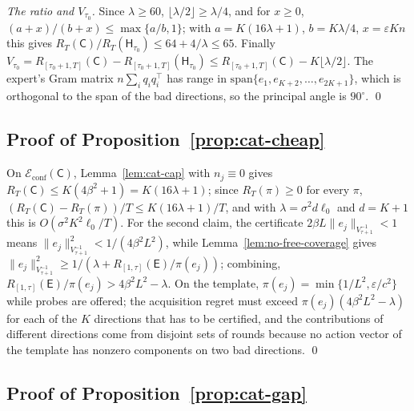 \documentclass{article}
\theoremstyle{definition}
\theoremstyle{remark}
\newcommand{\eps}{\varepsilon}
\theoremstyle{remark}
\newcommand{\Cold}{\mathsf{C}}
\newcommand{\Exp}{\mathsf{E}}
\newcommand{\Hyb}{\mathsf{H}}
\begin{document}
\emph{The ratio and $V_{\tau_0}$.} Since $\lambda\ge60$, $\lfloor\lambda/2\rfloor\ge\lambda/4$,
and for $x\ge0$, $(a+x)/(b+x)\le\max\{a/b,1\}$; with $a=K(16\lambda+1)$,
$b=K\lambda/4$, $x=\eps Kn$ this gives $R_T(\Cold)/R_T(\Hyb_{\tau_0})\le64+4/\lambda\le65$.
Finally $V_{\tau_0}=R_{[\tau_0+1,T]}(\Cold)-R_{[\tau_0+1,T]}(\Hyb_{\tau_0})\le R_{[\tau_0+1,T]}(\Cold)-K\lfloor\lambda/2\rfloor$.
The expert's Gram matrix $n\sum_iq_iq_i^\top$ has range in
$\mathrm{span}\{e_1,e_{K+2},\dots,e_{2K+1}\}$, which is orthogonal to the span of
the bad directions, so the principal angle is $90^\circ$. \qed

\subsection{Proof of Proposition~\ref{prop:cat-cheap}}

On $\mathcal E_{\mathrm{conf}}(\Cold)$, Lemma~\ref{lem:cat-cap} with $n_j\equiv0$
gives $R_T(\Cold)\le K(4\beta^2+1)=K(16\lambda+1)$; since $R_T(\pi)\ge0$ for every
$\pi$, $(R_T(\Cold)-R_T(\pi))/T\le K(16\lambda+1)/T$, and with $\lambda=\sigma^2d\ell_0$
and $d=K+1$ this is $O(\sigma^2K^2\ell_0/T)$. For the second claim, the
certificate $2\beta L\|e_j\|_{V_{\tau+1}^{-1}}<1$ means $\|e_j\|^2_{V_{\tau+1}^{-1}}<1/(4\beta^2L^2)$,
while Lemma~\ref{lem:no-free-coverage} gives
$\|e_j\|^2_{V_{\tau+1}^{-1}}\ge1/(\lambda+R_{[1,\tau]}(\Exp)/\pi(e_j))$; combining,
$R_{[1,\tau]}(\Exp)/\pi(e_j)>4\beta^2L^2-\lambda$. On the template,
$\pi(e_j)=\min\{1/L^2,\eps/c^2\}$ while probes are offered; the acquisition
regret must exceed $\pi(e_j)(4\beta^2L^2-\lambda)$ for each of the $K$ directions
that has to be certified, and the contributions of different directions come
from disjoint sets of rounds because no action vector of the template has
nonzero components on two bad directions. \qed

\subsection{Proof of Proposition~\ref{prop:cat-gap}}
\end{document}
